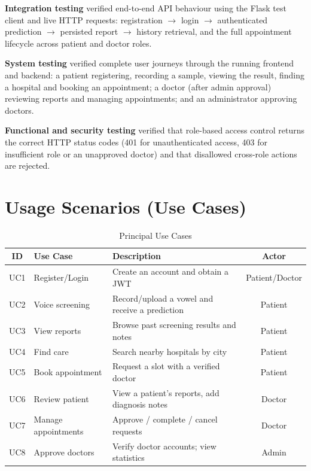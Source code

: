 \documentclass[oneside,a4paper,12pt]{report}
\begin{document}
\textbf{Integration testing} verified end-to-end API behaviour using the Flask test
client and live HTTP requests: registration $\rightarrow$ login $\rightarrow$
authenticated prediction $\rightarrow$ persisted report $\rightarrow$ history
retrieval, and the full appointment lifecycle across patient and doctor roles.

\textbf{System testing} verified complete user journeys through the running
frontend and backend: a patient registering, recording a sample, viewing the
result, finding a hospital and booking an appointment; a doctor (after admin
approval) reviewing reports and managing appointments; and an administrator
approving doctors.

\textbf{Functional and security testing} verified that role-based access control
returns the correct HTTP status codes (401 for unauthenticated access, 403 for
insufficient role or an unapproved doctor) and that disallowed cross-role actions
are rejected.

\section{Usage Scenarios (Use Cases)}
\begin{table}[H]
\centering
\caption{Principal Use Cases}
\label{tab:usecases}
\def\arraystretch{1.25}
\begin{tabularx}{\textwidth}{|c|l|X|c|}
\hline
\textbf{ID} & \textbf{Use Case} & \textbf{Description} & \textbf{Actor} \\ \hline
UC1 & Register/Login & Create an account and obtain a JWT & Patient/Doctor \\ \hline
UC2 & Voice screening & Record/upload a vowel and receive a prediction & Patient \\ \hline
UC3 & View reports & Browse past screening results and notes & Patient \\ \hline
UC4 & Find care & Search nearby hospitals by city & Patient \\ \hline
UC5 & Book appointment & Request a slot with a verified doctor & Patient \\ \hline
UC6 & Review patient & View a patient's reports, add diagnosis notes & Doctor \\ \hline
UC7 & Manage appointments & Approve / complete / cancel requests & Doctor \\ \hline
UC8 & Approve doctors & Verify doctor accounts; view statistics & Admin \\ \hline
\end{tabularx}
\end{table}
\end{document}
